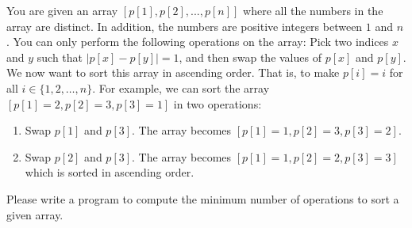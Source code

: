 You are given an array $[p[1], p[2], ..., p[n]]$ where
all the numbers in the array are distinct.
In addition, the numbers are positive integers between $1$ and $n$.
You can only perform the following operations on the array:
Pick two indices $x$ and $y$ such that $|p[x] - p[y]| = 1$, 
and then swap the values of $p[x]$ and $p[y]$.
We now want to sort this array in ascending order. 
That is, to make $p[i] = i$ for all $i\in\{1,2,\dots,n\}$.
For example, we can sort the array $[p[1]=2,p[2]=3,p[3]=1]$ in two operations:
\begin{enumerate}
\item Swap $p[1]$ and $p[3]$. The array becomes $[p[1]=1,p[2]=3,p[3]=2]$.
\item Swap $p[2]$ and $p[3]$. The array becomes $[p[1]=1,p[2]=2,p[3]=3]$ which
is sorted in ascending order.
\end{enumerate}

Please write a program to compute the minimum number of operations to
sort a given array.
